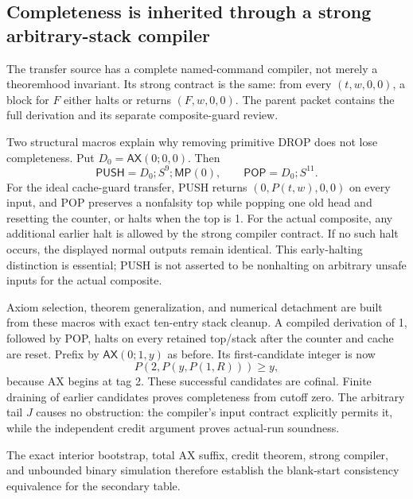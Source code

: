 \subsection{Completeness is inherited through a strong arbitrary-stack compiler}
The transfer source has a complete named-command compiler, not merely a theoremhood invariant. Its strong contract is the same: from every $(t,w,0,0)$, a block for $F$ either halts or returns $(F,w,0,0)$. The parent packet contains the full derivation and its separate composite-guard review.

Two structural macros explain why removing primitive DROP does not lose completeness. Put $D_0=\mathsf{AX}(0;0,0)$. Then
\[
 \mathsf{PUSH}=D_0;S^9;\mathsf{MP}(0),\qquad
 \mathsf{POP}=D_0;S^{11}.
\]
For the ideal cache-guard transfer, PUSH returns $(0,P(t,w),0,0)$ on every input, and POP preserves a nonfalsity top while popping one old head and resetting the counter, or halts when the top is 1. For the actual composite, any additional earlier halt is allowed by the strong compiler contract. If no such halt occurs, the displayed normal outputs remain identical. This early-halting distinction is essential; PUSH is not asserted to be nonhalting on arbitrary unsafe inputs for the actual composite.

Axiom selection, theorem generalization, and numerical detachment are built from these macros with exact ten-entry stack cleanup. A compiled derivation of 1, followed by POP, halts on every retained top/stack after the counter and cache are reset. Prefix by $\mathsf{AX}(0;1,y)$ as before. Its first-candidate integer is now
\[
                              P(2,P(y,P(1,R)))\ge y,
\]
because AX begins at tag 2. These successful candidates are cofinal. Finite draining of earlier candidates proves completeness from cutoff zero. The arbitrary tail $J$ causes no obstruction: the compiler's input contract explicitly permits it, while the independent credit argument proves actual-run soundness.

The exact interior bootstrap, total AX suffix, credit theorem, strong compiler, and unbounded binary simulation therefore establish the blank-start consistency equivalence for the secondary table.
